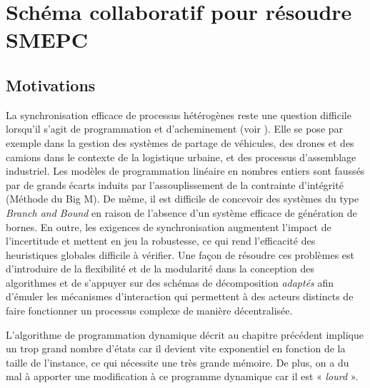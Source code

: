 \chapter{Schéma collaboratif pour résoudre SMEPC}
\minitoc
\newpage
\label{Heuristique}
\section{Motivations}

La synchronisation efficace de processus hétérogènes reste une question difficile lorsqu'il s'agit de programmation et d'acheminement (voir \cite{article_synchro2}).
Elle se pose par exemple dans la gestion des systèmes de partage de véhicules, des drones et des camions dans le contexte de la logistique urbaine, et des processus d'assemblage industriel. Les modèles de programmation linéaire en nombres entiers sont faussés par de grands écarts induits par l'assouplissement de la contrainte d'intégrité (Méthode du Big M). De même, il est difficile de concevoir des systèmes du type \textit{ Branch and Bound} en raison de l'absence d'un système  efficace de génération de bornes. En outre, les exigences de synchronisation augmentent l'impact de l'incertitude et mettent en jeu la robustesse, ce qui rend l'efficacité des heuristiques globales difficile à vérifier. Une façon de résoudre ces problèmes est d'introduire de la flexibilité et de la modularité dans la conception des algorithmes et de s'appuyer sur des schémas de décomposition \textit{adaptés} afin d'émuler les mécanismes d'interaction qui permettent à des acteurs distincts de faire fonctionner un processus complexe de manière décentralisée.  

L'algorithme de programmation dynamique décrit au chapitre précédent implique un trop grand nombre d'états car il devient vite exponentiel en fonction de la taille de l'instance, ce qui nécessite une très grande mémoire. De plus, on a du mal à apporter une modification à ce programme dynamique car il est « \textit{lourd} ».

